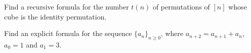 \documentclass[addpoints]{exam}
\begin{document}
  \pagestyle{headandfoot}
  \runningheadrule

  \firstpagefooter{}{}{}
  \runningfooter{}{}{}
  \begin{flushright}

    \vspace{0.2in}
  \end{flushright}

  \begin{questions}
    \question
      Find a recursive formula for the number $t(n)$ of permutations of $[n]$
			whose cube is the identity permutation.

      \begin{solution}[\stretch{1}]
      \end{solution}
      \newpage
    \question
      Find an explicit formula for the sequence $\{a_n\}_{n \ge 0}$, where
			$a_{n + 2} = a_{n + 1} + a_n$, $a_0 = 1$ and $a_1 = 3$.

      \begin{solution}[\stretch{1}]
      \end{solution}
      \newpage
  \end{questions}
\end{document}
